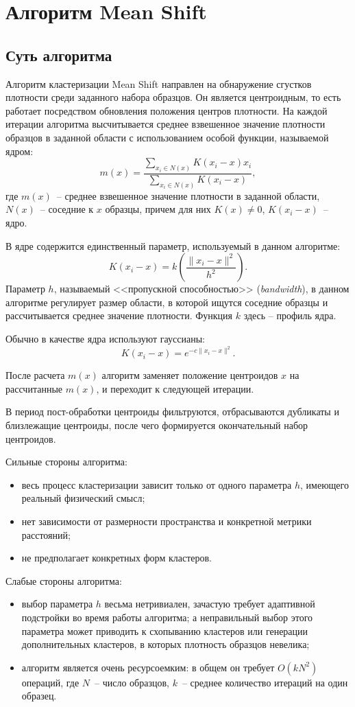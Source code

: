 \chapter{Алгоритм Mean Shift}
\section{Суть алгоритма}
Алгоритм кластеризации Mean Shift направлен на обнаружение сгустков плотности среди заданного
набора образцов. Он является центроидным, то есть работает посредством обновления положения центров
плотности. На каждой итерации алгоритма высчитывается среднее взвешенное значение плотности
образцов в заданной области с использованием особой функции, называемой ядром:
\[
    m(x) = \frac{\sum_{x_i \in N(x)} K(x_i - x)x_i}{\sum_{x_i \in N(x)} K(x_i - x)},
\]
где \( m(x) \)~-- среднее взвешенное значение плотности в заданной области, \( N(x) \)~--
соседние к \( x \) образцы, причем для них \( K(x) \ne 0 \), \( K(x_i - x) \)~-- ядро.

В ядре содержится единственный параметр, используемый в данном ал\-го\-рит\-ме:
\[
    K(x_i - x) = k\left( \frac{\|x_i - x\|^2}{h^2} \right).
\]
Параметр \( h \), называемый <<пропускной способностью>> (\emph{bandwidth}), в данном
ал\-го\-рит\-ме регулирует размер области, в которой ищутся соседние образцы и рассчитывается
среднее значение плотности. Функция \( k \) здесь -- профиль ядра.

Обычно в качестве ядра используют гауссианы:
\[
    K(x_i - x) = e^{-c\|x_i - x\|^2}.
\]

После расчета \( m(x) \) алгоритм заменяет положение центроидов \( x \) на рас\-счи\-тан\-ные
\( m(x) \), и переходит к следующей итерации.

В период пост-обработки центроиды фильтруются, отбрасываются дуб\-ли\-ка\-ты и близлежащие
центроиды, после чего формируется окончательный набор центроидов.

Сильные стороны алгоритма:
\begin{itemize}
    \item весь процесс кластеризации зависит только от одного параметра \( h \), имеющего реальный
        физический смысл;
    \item нет зависимости от размерности пространства и конкретной метрики расстояний;
    \item не предполагает конкретных форм кластеров.
\end{itemize}

Слабые стороны алгоритма:
\begin{itemize}
    \item выбор параметра \( h \) весьма нетривиален, зачастую требует адаптивной подстройки во
        время работы алгоритма; а неправильный выбор этого параметра может приводить к схопыванию
        кластеров или генерации дополнительных кластеров, в которых плотность образцов невелика;
    \item алгоритм является очень ресурсоемким: в общем он требует \( O(kN^2) \) операций, где
        \( N \)~-- число образцов, \( k \)~-- среднее количество итераций на один образец.
\end{itemize}


